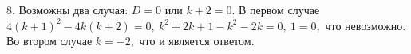 8. Возможны два случая: $D=0$ или $k+2=0.$ В первом случае $4(k+1)^2-4k(k+2)=0,\ k^2+2k+1-k^2-2k=0,\ 1=0,$ что невозможно. Во втором случае $k=-2,$ что и является ответом.\\
